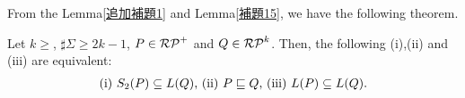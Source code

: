 From the Lemma\ref{追加補題1} and Lemma\ref{補題15},
we have the following theorem.


\begin{thm}\label{定理17}
    Let $k \geq$, $\sharp\Sigma \geq 2k-1$, $P \in \mathcal{RP}^{+}$ and
    $Q \in \mathcal{RP}^{k}$.
    Then, the following (i),(ii) and (iii) are equivalent:
    \[
        \begin{tabular}{ll}
            $(\mathrm{i})$ $S_{2}(P) \subseteq L(Q)$,
            $(\mathrm{ii})$ $P \sqsubseteq Q$,
            $(\mathrm{iii})$ $L(P) \subseteq L(Q)$.
        \end{tabular}
    \]
\end{thm}


